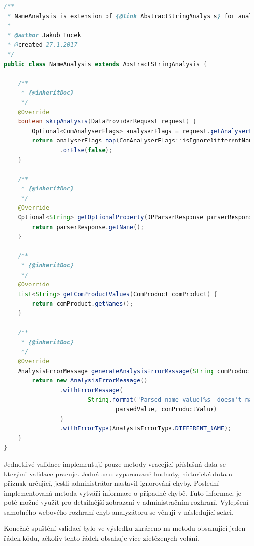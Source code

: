 \documentclass[thesis=B,czech]{FITthesis}[2012/06/26]
\begin{document}
\begin{lstlisting}[language=Java, caption={Validace kontrolující hodnotu získaného jména produktu.}]
/**
 * NameAnalysis is extension of {@link AbstractStringAnalysis} for analysing Name.
 *
 * @author Jakub Tucek
 * @created 27.1.2017
 */
public class NameAnalysis extends AbstractStringAnalysis {

    /**
     * {@inheritDoc}
     */
    @Override
    boolean skipAnalysis(DataProviderRequest request) {
        Optional<ComAnalyserFlags> analyserFlags = request.getAnalyserFlags();
        return analyserFlags.map(ComAnalyserFlags::isIgnoreDifferentName)
                .orElse(false);
    }

    /**
     * {@inheritDoc}
     */
    @Override
    Optional<String> getOptionalProperty(DPParserResponse parserResponse) {
        return parserResponse.getName();
    }

    /**
     * {@inheritDoc}
     */
    @Override
    List<String> getComProductValues(ComProduct comProduct) {
        return comProduct.getNames();
    }

    /**
     * {@inheritDoc}
     */
    @Override
    AnalysisErrorMessage generateAnalysisErrorMessage(String comProductValue, String parsedValue) {
        return new AnalysisErrorMessage()
                .withErrorMessage(
                        String.format("Parsed name value[%s] doesn't match known name value[%s]",
                                parsedValue, comProductValue)
                )
                .withErrorType(AnalysisErrorType.DIFFERENT_NAME);
    }
}
\end{lstlisting}
Jednotlivé validace implementují pouze metody vracející příslušná data se kterými validace pracuje. Jedná se o vyparsované hodnoty, historická
data a příznak určující, jestli administrátor nastavil ignorování chyby.
Poslední implementovaná metoda vytváří informace o případné chybě. Tuto informaci je poté
možné využít pro detailnější zobrazení v administračním rozhraní. Vylepšení samotného webového rozhraní chyb analyzátoru se věnuji v následující sekci.
\par
Konečné spuštění validací bylo ve výsledku zkráceno na metodu obsahující jeden řádek kódu, ačkoliv tento řádek
obsahuje více zřetězených volání.
\par
\end{document}
